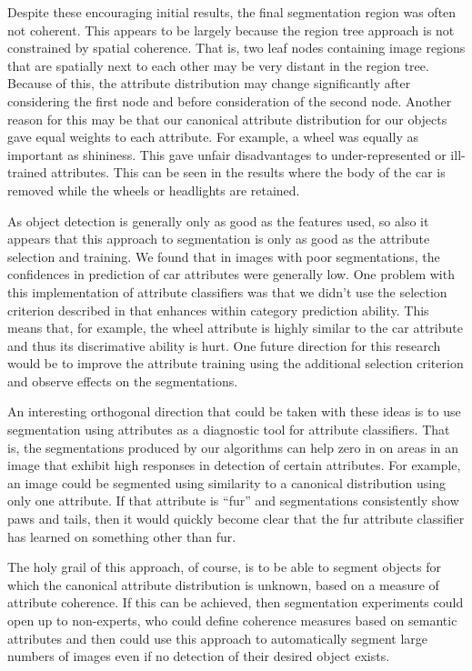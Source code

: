 \documentclass[10pt,twocolumn,letterpaper]{article}
\begin{document}
Despite these encouraging initial results, the final segmentation region 
was often not coherent.
This appears to be largely because the region tree approach is not
constrained by spatial coherence.  That is, two leaf nodes containing image
regions that are spatially next to each other may be very distant in the
region tree.  Because of this, the attribute distribution may change significantly
after considering the first node and before consideration of the second node.
Another reason for this may be that our canonical attribute distribution for
our objects gave equal weights to each attribute.  For example, a wheel was
equally as important as shininess.  This gave unfair disadvantages to
under-represented or ill-trained attributes.  This can be seen in the results
where the body of the car is removed while the wheels or headlights are
retained.

As object detection is generally only as good as the features used, so also it
appears that this approach to segmentation is only as good as the attribute
selection and training.  We found that in images with poor segmentations, the
confidences in prediction of car attributes were generally low.  One problem
with this implementation of attribute classifiers was that we didn't use 
the selection criterion described in \cite{farhadi09} that enhances within
category prediction ability.  This means that, for example, the wheel attribute
is highly similar to the car attribute and thus its discrimative ability
is hurt.  One future direction for this research would be to improve the attribute
training using the additional selection criterion and observe effects on
the segmentations.

An interesting orthogonal direction that could be taken with these ideas is to
use segmentation using attributes as a diagnostic tool for attribute classifiers.
That is, the segmentations produced by our algorithms can help zero in on areas
in an image that exhibit high responses in detection of certain attributes.
For example, an image could be segmented using similarity to a canonical distribution
using only one attribute.  If that attribute is ``fur'' and segmentations
consistently show paws and tails, then it would quickly become clear that
the fur attribute classifier has learned on something other than fur.

The holy grail of this approach, of course, is to be able to segment objects
for which the canonical attribute distribution is unknown, based on a measure
of attribute coherence.  If this can be achieved, then segmentation experiments
could open up to non-experts, who could define coherence measures based on
semantic attributes and then could use this approach to automatically segment large
numbers of images even if no detection of their desired object exists.
\end{document}
